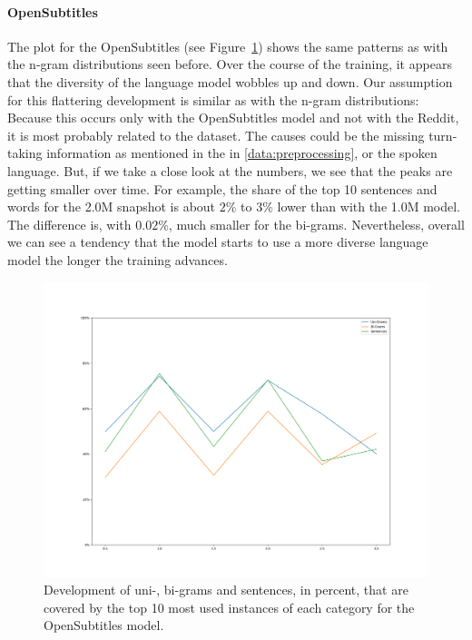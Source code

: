 \paragraph{OpenSubtitles} The plot for the OpenSubtitles (see Figure~\ref{results:language_model:diversity:opensubtitles}) shows the same patterns as with the n-gram distributions seen before. Over the course of the training, it appears that the diversity of the language model wobbles up and down. Our assumption for this flattering development is similar as with the n-gram distributions: Because this occurs only with the OpenSubtitles model and not with the Reddit, it is most probably related to the dataset. The causes could be the missing turn-taking information as mentioned in the in \ref{data:preprocessing}, or the spoken language. But, if we take a close look at the numbers, we see that the peaks are getting smaller over time. For example, the share of the top 10 sentences and words for the 2.0M snapshot is about $2\%$ to $3\%$ lower than with the 1.0M model. The difference is, with $0.02\%$, much smaller for the bi-grams. Nevertheless, overall we can see a tendency that the model starts to use a more diverse language model the longer the training advances.

\begin{figure}[H]
	\includegraphics[width=\linewidth]{img/plots/opensubtitles_not_reversed/diversity_perc_plot.png}
	\caption{Development of uni-, bi-grams and sentences, in percent, that are covered by the top 10 most used instances of each category for the OpenSubtitles model.}
	\label{results:language_model:diversity:opensubtitles}
\end{figure}

